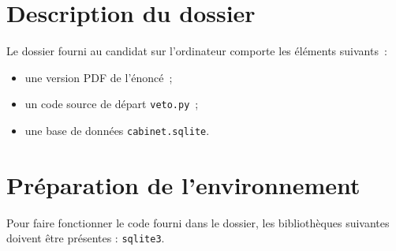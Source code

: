 \documentclass[a4paper,12pt]{article}
\begin{document}
\appel

\section*{\centering Description du dossier}

Le dossier fourni au candidat sur l’ordinateur comporte les éléments suivants :

\begin{itemize}
    \item une version PDF de l’énoncé ;
    \item un code source de départ \verb|veto.py| ;
    \item une base de données \verb|cabinet.sqlite|.
\end{itemize}

\section*{Préparation de l'environnement}

Pour faire fonctionner le code fourni dans le dossier, les bibliothèques
suivantes doivent être présentes : \verb|sqlite3|.
\end{document}
